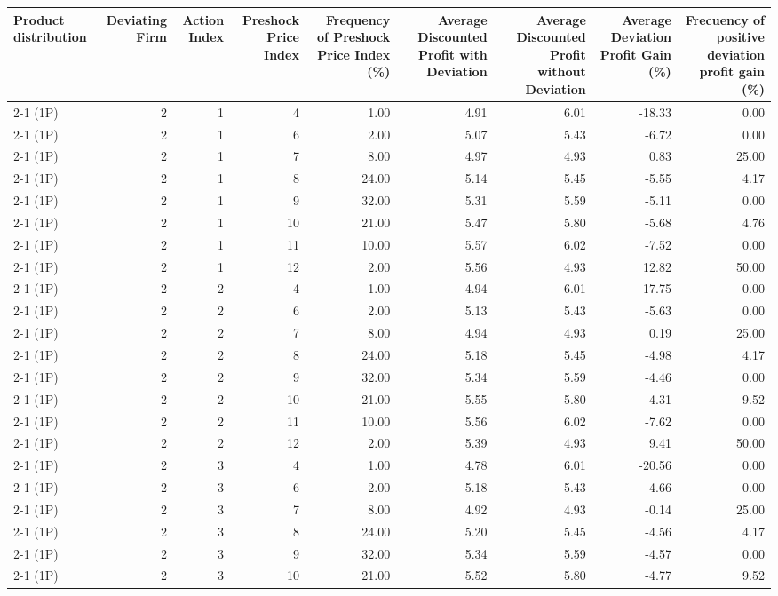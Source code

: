 \begin{tabular}{lrrrrrrrr}
\toprule
Product distribution & Deviating Firm & Action Index & Preshock Price Index & Frequency of Preshock Price Index (\%) & Average Discounted Profit with Deviation & Average Discounted Profit without Deviation & Average Deviation Profit Gain (\%) & Frecuency of positive deviation profit gain (\%) \\
\midrule
2-1 (1P) & 2 & 1 & 4 & 1.00 & 4.91 & 6.01 & -18.33 & 0.00 \\
2-1 (1P) & 2 & 1 & 6 & 2.00 & 5.07 & 5.43 & -6.72 & 0.00 \\
2-1 (1P) & 2 & 1 & 7 & 8.00 & 4.97 & 4.93 & 0.83 & 25.00 \\
2-1 (1P) & 2 & 1 & 8 & 24.00 & 5.14 & 5.45 & -5.55 & 4.17 \\
2-1 (1P) & 2 & 1 & 9 & 32.00 & 5.31 & 5.59 & -5.11 & 0.00 \\
2-1 (1P) & 2 & 1 & 10 & 21.00 & 5.47 & 5.80 & -5.68 & 4.76 \\
2-1 (1P) & 2 & 1 & 11 & 10.00 & 5.57 & 6.02 & -7.52 & 0.00 \\
2-1 (1P) & 2 & 1 & 12 & 2.00 & 5.56 & 4.93 & 12.82 & 50.00 \\
2-1 (1P) & 2 & 2 & 4 & 1.00 & 4.94 & 6.01 & -17.75 & 0.00 \\
2-1 (1P) & 2 & 2 & 6 & 2.00 & 5.13 & 5.43 & -5.63 & 0.00 \\
2-1 (1P) & 2 & 2 & 7 & 8.00 & 4.94 & 4.93 & 0.19 & 25.00 \\
2-1 (1P) & 2 & 2 & 8 & 24.00 & 5.18 & 5.45 & -4.98 & 4.17 \\
2-1 (1P) & 2 & 2 & 9 & 32.00 & 5.34 & 5.59 & -4.46 & 0.00 \\
2-1 (1P) & 2 & 2 & 10 & 21.00 & 5.55 & 5.80 & -4.31 & 9.52 \\
2-1 (1P) & 2 & 2 & 11 & 10.00 & 5.56 & 6.02 & -7.62 & 0.00 \\
2-1 (1P) & 2 & 2 & 12 & 2.00 & 5.39 & 4.93 & 9.41 & 50.00 \\
2-1 (1P) & 2 & 3 & 4 & 1.00 & 4.78 & 6.01 & -20.56 & 0.00 \\
2-1 (1P) & 2 & 3 & 6 & 2.00 & 5.18 & 5.43 & -4.66 & 0.00 \\
2-1 (1P) & 2 & 3 & 7 & 8.00 & 4.92 & 4.93 & -0.14 & 25.00 \\
2-1 (1P) & 2 & 3 & 8 & 24.00 & 5.20 & 5.45 & -4.56 & 4.17 \\
2-1 (1P) & 2 & 3 & 9 & 32.00 & 5.34 & 5.59 & -4.57 & 0.00 \\
2-1 (1P) & 2 & 3 & 10 & 21.00 & 5.52 & 5.80 & -4.77 & 9.52 \\

\end{tabular}
